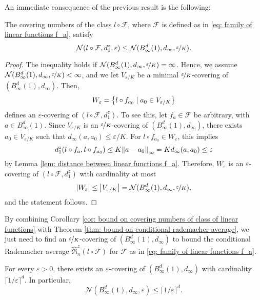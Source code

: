 An immediate consequence of the previous result is the following:

\begin{corollary}
\label{cor: bound on covering numbers of class of linear functions}
The covering numbers of the class $l \circ \mathcal{F}$, where $\mathcal{F}$ is defined as in \eqref{eq: family of linear functions f_a}, satisfy
\[
    \mathcal{N}(l \circ \mathcal{F}, d_1^z, \varepsilon) \leq \mathcal{N}(B_{\infty}^d(1), d_{\infty}, \nicefrac{\varepsilon}{K}).
\]
\end{corollary}

\begin{proof}
The inequality holds if $\mathcal{N}(B_{\infty}^d(1), d_{\infty}, \nicefrac{\varepsilon}{K}) = \infty$. Hence, we assume $\mathcal{N}(B_{\infty}^d(1), d_{\infty}, \nicefrac{\varepsilon}{K}) < \infty$, and we let $V_{\varepsilon / K}$ be a minimal $\nicefrac{\varepsilon}{K}$-covering of $(B_{\infty}^d(1), d_{\infty})$. Then,
\[
    W_{\varepsilon} = \set{l \circ f_{a_0} \with a_0 \in V_{\varepsilon / K}}
\]
defines an $\varepsilon$-covering of $(l \circ \mathcal{F}, d_1^z)$. To see this, let $f_a \in \mathcal{F}$ be arbitrary, with $a \in B_{\infty}^d(1)$. Since $V_{\varepsilon / K}$ is an $\nicefrac{\varepsilon}{K}$-covering of $(B_{\infty}^d(1), d_{\infty})$, there exists $a_0 \in V_{\varepsilon / K}$ such that $d_{\infty}(a, a_0) \leq \varepsilon / K$. For $l \circ f_{a_0} \in W_{\varepsilon}$, this implies
\[
    d_1^z(l \circ f_a, l \circ f_{a_0}) \leq K \norm{a - a_0}_{\infty} = K d_{\infty}(a, a_0) \leq \varepsilon
\]
by Lemma \ref{lem: distance between linear functions f_a}. Therefore, $W_{\varepsilon}$ is an $\varepsilon$-covering of $(l \circ \mathcal{F}, d_1^z)$ with cardinality at most
\[
    \abs{W_{\varepsilon}} \leq \abs{V_{\varepsilon / K}} = \mathcal{N}(B_{\infty}^d(1), d_{\infty}, \nicefrac{\varepsilon}{K}),
\]
and the statement follows.
\end{proof}

By combining Corollary \ref{cor: bound on covering numbers of class of linear functions} with Theorem \ref{thm: bound on conditional rademacher average}, we just need to find an $\nicefrac{\varepsilon}{K}$-covering of $(B_{\infty}^d(1), d_{\infty})$ to bound the conditional Rademacher average $\hat{\mathfrak{R}}_n^z(l \circ \mathcal{F})$ for $\mathcal{F}$ as in \eqref{eq: family of linear functions f_a}.

\begin{lemma}
For every $\varepsilon > 0$, there exists an $\varepsilon$-covering of $(B_{\infty}^d(1), d_{\infty})$ with cardinality $\lceil 1 / \varepsilon \rceil^d$. In particular,
\[
    \mathcal{N}(B_{\infty}^d(1), d_{\infty}, \varepsilon) \leq \lceil 1 / \varepsilon \rceil^d.
\]
\end{lemma}

